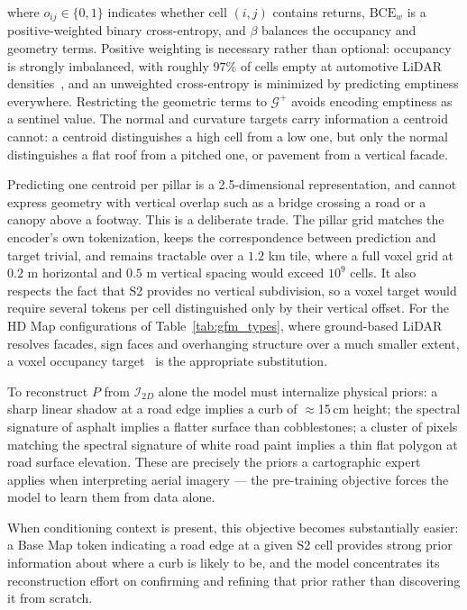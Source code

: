\documentclass{book}
\begin{document}
where $o_{ij} \in \{0,1\}$ indicates whether cell $(i,j)$ contains
returns, $\mathrm{BCE}_{w}$ is a positive-weighted binary
cross-entropy, and $\beta$ balances the occupancy and geometry
terms.  Positive weighting is necessary rather than optional:
occupancy is strongly imbalanced, with roughly $97\%$ of cells
empty at automotive LiDAR densities~\cite{lang2019pointpillars}, and
an unweighted cross-entropy is minimized by predicting emptiness
everywhere.  Restricting the geometric terms to $\mathcal{G}^{+}$
avoids encoding emptiness as a sentinel value.  The normal and
curvature targets carry information a centroid cannot: a centroid
distinguishes a high cell from a low one, but only the normal
distinguishes a flat roof from a pitched one, or pavement from a
vertical facade.

Predicting one centroid per pillar is a 2.5-dimensional
representation, and cannot express geometry with vertical overlap
such as a bridge crossing a road or a canopy above a footway.  This
is a deliberate trade.  The pillar grid matches the encoder's own
tokenization, keeps the correspondence between prediction and
target trivial, and remains tractable over a $1.2$ km tile, where a
full voxel grid at $0.2$ m horizontal and $0.5$ m vertical spacing
would exceed $10^9$ cells.  It also respects the fact that S2
provides no vertical subdivision, so a voxel target would require
several tokens per cell distinguished only by their vertical
offset.  For the HD Map configurations of
Table~\ref{tab:gfm_types}, where ground-based LiDAR resolves
facades, sign faces and overhanging structure over a much smaller
extent, a voxel occupancy target~\cite{min2022mae3d} is the
appropriate substitution.

To reconstruct $P$ from $\mathcal{I}_{2D}$ alone the model
must internalize physical priors: a sharp linear shadow at a
road edge implies a curb of $\approx$15\,cm height; the
spectral signature of asphalt implies a flatter surface than
cobblestones; a cluster of pixels matching the spectral
signature of white road paint implies a thin flat polygon at
road surface elevation.  These are precisely the priors a
cartographic expert applies when interpreting aerial imagery
--- the pre-training objective forces the model to learn them
from data alone.

When conditioning context is present, this objective becomes
substantially easier: a Base Map token indicating a road edge
at a given S2 cell provides strong prior information about
where a curb is likely to be, and the model concentrates its
reconstruction effort on confirming and refining that prior
rather than discovering it from scratch.
\end{document}
